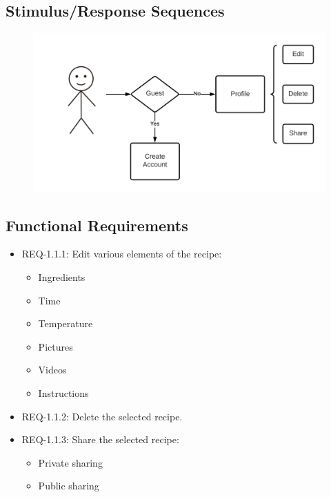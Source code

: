 \documentclass{scrreprt}
\begin{document}
\subsection{Stimulus/Response Sequences}

\begin{figure}[H]\centering
    \includegraphics[width=\columnwidth]{FlowCharts/Recipe-Creation.png}
\end{figure}

\subsection{Functional Requirements}

\begin{itemize}
    \item REQ-1.1.1: Edit various elements of the recipe:
          \begin{itemize}
              \item Ingredients
              \item Time
              \item Temperature
              \item Pictures
              \item Videos
              \item Instructions
          \end{itemize}
    \item REQ-1.1.2: Delete the selected recipe.
    \item REQ-1.1.3: Share the selected recipe:
          \begin{itemize}
              \item Private sharing
              \item Public sharing
          \end{itemize}
\end{itemize}
\end{document}

